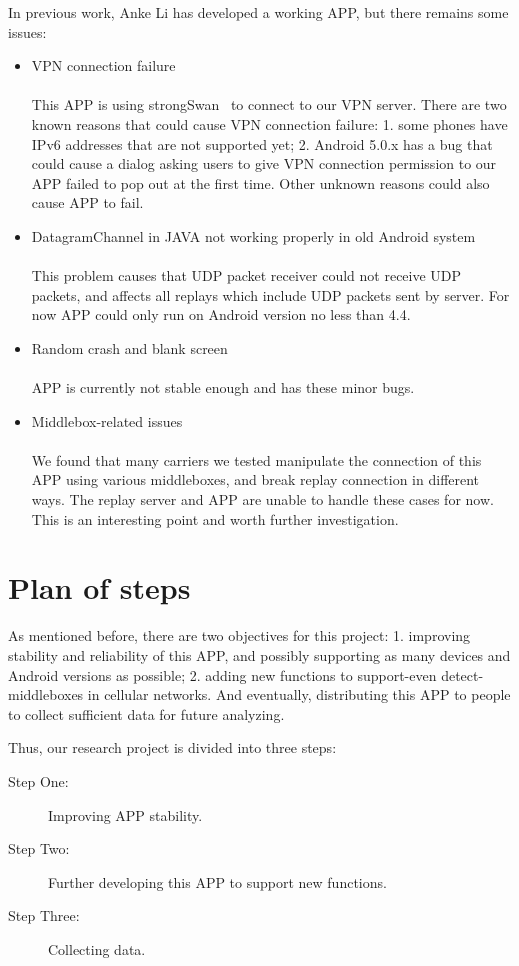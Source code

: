 \documentclass[letterpaper]{sig-alternate-10pt}
\begin{document}
In previous work, Anke Li has developed a working APP, but there remains some issues:
\begin{itemize}
  \item VPN connection failure\\\\
  This APP is using strongSwan~\cite{strongSwan} to connect to our VPN server. There are two known reasons that could cause VPN connection failure: 1. some phones have IPv6 addresses that are not supported yet; 2. Android 5.0.x has a bug that could cause a dialog asking users to give VPN connection permission to our APP failed to pop out at the first time. Other unknown reasons could also cause APP to fail.
  \item DatagramChannel in JAVA not working properly in old Android system\\\\
  This problem causes that UDP packet receiver could not receive UDP packets, and affects all replays which include UDP packets sent by server. For now APP could only run on Android version no less than 4.4.
  \item Random crash and blank screen\\\\
  APP is currently not stable enough and has these minor bugs.
  \item Middlebox-related issues\\\\
  We found that many carriers we tested manipulate the connection of this APP using various middleboxes, and break replay connection in different ways. The replay server and APP are unable to handle these cases for now. This is an interesting point and worth further investigation.
\end{itemize}

\section{Plan of steps}
As mentioned before, there are two objectives for this project: 1. improving stability and reliability of this APP, and possibly supporting as many devices and Android versions as possible; 2. adding new functions to support-even detect-middleboxes in cellular networks.
And eventually, distributing this APP to people to collect sufficient data for future analyzing.

Thus, our research project is divided into three steps:
\begin{description}
  \item[Step One:] Improving APP stability.
  \item[Step Two:] Further developing this APP to support new functions.
  \item[Step Three:] Collecting data.
\end{description}
\end{document}
